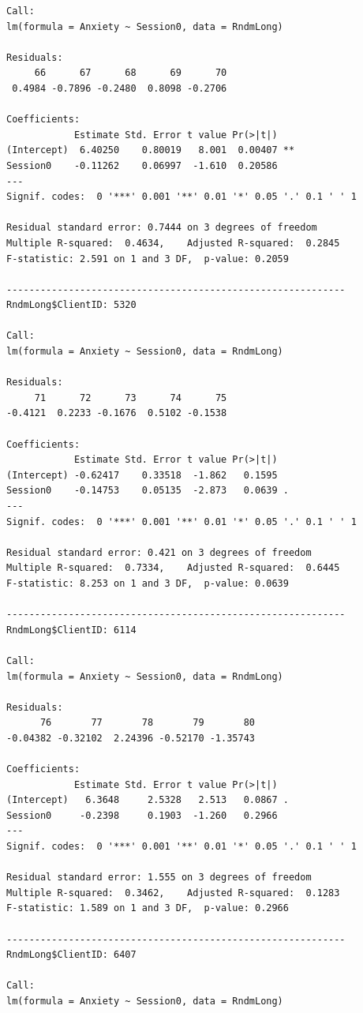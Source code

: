\documentclass[
  english,
]{book}
\begin{document}
\begin{verbatim}
Call:
lm(formula = Anxiety ~ Session0, data = RndmLong)

Residuals:
     66      67      68      69      70 
 0.4984 -0.7896 -0.2480  0.8098 -0.2706 

Coefficients:
            Estimate Std. Error t value Pr(>|t|)   
(Intercept)  6.40250    0.80019   8.001  0.00407 **
Session0    -0.11262    0.06997  -1.610  0.20586   
---
Signif. codes:  0 '***' 0.001 '**' 0.01 '*' 0.05 '.' 0.1 ' ' 1

Residual standard error: 0.7444 on 3 degrees of freedom
Multiple R-squared:  0.4634,    Adjusted R-squared:  0.2845 
F-statistic: 2.591 on 1 and 3 DF,  p-value: 0.2059

------------------------------------------------------------ 
RndmLong$ClientID: 5320

Call:
lm(formula = Anxiety ~ Session0, data = RndmLong)

Residuals:
     71      72      73      74      75 
-0.4121  0.2233 -0.1676  0.5102 -0.1538 

Coefficients:
            Estimate Std. Error t value Pr(>|t|)  
(Intercept) -0.62417    0.33518  -1.862   0.1595  
Session0    -0.14753    0.05135  -2.873   0.0639 .
---
Signif. codes:  0 '***' 0.001 '**' 0.01 '*' 0.05 '.' 0.1 ' ' 1

Residual standard error: 0.421 on 3 degrees of freedom
Multiple R-squared:  0.7334,    Adjusted R-squared:  0.6445 
F-statistic: 8.253 on 1 and 3 DF,  p-value: 0.0639

------------------------------------------------------------ 
RndmLong$ClientID: 6114

Call:
lm(formula = Anxiety ~ Session0, data = RndmLong)

Residuals:
      76       77       78       79       80 
-0.04382 -0.32102  2.24396 -0.52170 -1.35743 

Coefficients:
            Estimate Std. Error t value Pr(>|t|)  
(Intercept)   6.3648     2.5328   2.513   0.0867 .
Session0     -0.2398     0.1903  -1.260   0.2966  
---
Signif. codes:  0 '***' 0.001 '**' 0.01 '*' 0.05 '.' 0.1 ' ' 1

Residual standard error: 1.555 on 3 degrees of freedom
Multiple R-squared:  0.3462,    Adjusted R-squared:  0.1283 
F-statistic: 1.589 on 1 and 3 DF,  p-value: 0.2966

------------------------------------------------------------ 
RndmLong$ClientID: 6407

Call:
lm(formula = Anxiety ~ Session0, data = RndmLong)


\end{verbatim}
\end{document}
